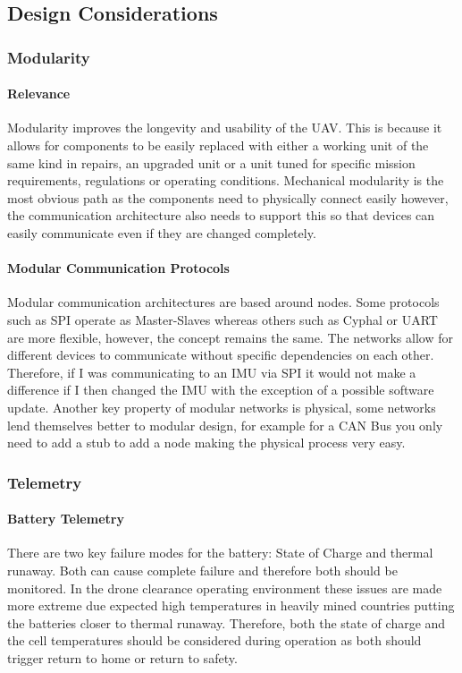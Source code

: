 \subsection{Design Considerations}
\subsubsection{Modularity}
\paragraph{Relevance}
Modularity improves the longevity and usability of the \gls{UAV}. This is because it allows for components to be easily replaced with either a working unit of the same kind in repairs, an upgraded unit or a unit tuned for specific mission requirements, regulations or operating conditions. Mechanical modularity is the most obvious path as the components need to physically connect easily however, the communication architecture also needs to support this so that devices can easily communicate even if they are changed completely.
\paragraph{Modular Communication Protocols}
Modular communication architectures are based around nodes. Some protocols such as \gls{SPI} operate as Master-Slaves whereas others such as Cyphal or \gls{UART} are more flexible, however, the concept remains the same. The networks allow for different devices to communicate without specific dependencies on each other. Therefore, if I was communicating to an \gls{IMU} via \gls{SPI} it would not make a difference if I then changed the \gls{IMU} with the exception of a possible software update. Another key property of modular networks is physical, some networks lend themselves better to modular design, for example for a \gls{CAN} Bus you only need to add a stub to add a node making the physical process very easy.

\subsubsection{Telemetry}
\paragraph{Battery Telemetry}
There are two key failure modes for the battery: State of Charge and thermal runaway. Both can cause complete failure and therefore both should be monitored. In the drone clearance operating environment these issues are made more extreme due expected high temperatures in heavily mined countries putting the batteries closer to thermal runaway. Therefore, both the state of charge and the cell temperatures should be considered during operation as both should trigger return to home or return to safety. 
